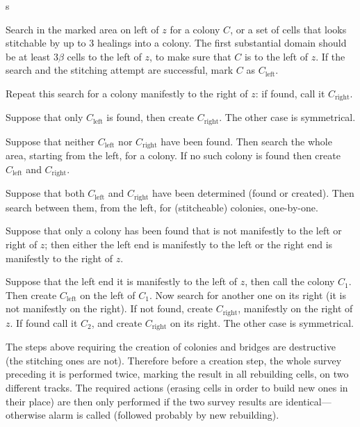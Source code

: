 \documentclass[11pt]{memoir}
\theoremstyle{definition} %
\newcommand{\Left}{\text{left}}
\newcommand{\Right}{\text{right}}
\begin{document}
\begin{varenum}{s}
\item\label{i:survey.left}
Search in the marked area on left of \( z \) for a colony \( C \),
or a set of cells that looks stitchable by up to 3 healings into a colony.
The first substantial domain should be at least \( 3\beta \) cells to the left of \( z \),
to make sure that \( C \) is  to the left of \( z \).
If the search and the stitching attempt are successful, mark \( C \) as \( C_{\Left} \).

Repeat this search for a colony manifestly to the right of \( z \): if found, call it \( C_{\Right} \).

\item Suppose that only \( C_{\Left} \) is found, then create \( C_{\Right} \).
The other case is symmetrical.

\item Suppose that neither \( C_{\Left} \) nor \( C_{\Right} \) have been found.
Then search the whole area, starting from the left, for a colony.
If no such colony is found then create \( C_{\Left} \) and \( C_{\Right} \).

\item\label{i:survey.both} Suppose that both \( C_{\Left} \) and \( C_{\Right} \) 
have been determined (found or created).
Then search between them, from the left, for (stitcheable) colonies, one-by-one.

\item Suppose that only a colony has been found that 
is not manifestly to the left or right of \( z \); then either the left end is manifestly to the left or
the right end is manifestly to the right of \( z \).

Suppose that the left end it is manifestly to the left of \( z \), then call the colony \( C_{1} \).
Then create \( C_{\Left} \) on the left of  \( C_{1} \).
Now search for another one on its right (it is not manifestly on the right).
If not found, create \( C_{\Right} \), manifestly on the right of \( z \).
If found call it \( C_{2} \), and create \( C_{\Right} \) on its right.
The other case is symmetrical.

\end{varenum}

The steps above requiring the creation of colonies and bridges are destructive
(the stitching ones are not).
Therefore before a creation step, the whole survey preceding it is performed twice, 
marking the result in all rebuilding cells, on two different tracks.
The required actions (erasing cells in order to build new ones in their place)
are then only performed if the two survey results are identical---otherwise alarm is called
(followed probably by new rebuilding).
\end{document}
